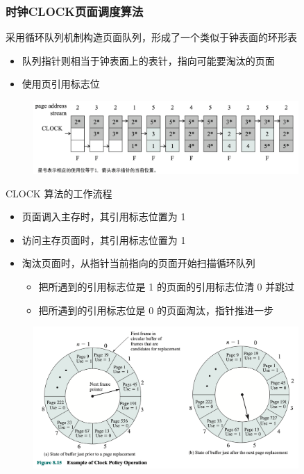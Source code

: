 \documentclass[cs4size,a4paper,10pt]{ctexart}
\begin{document}
		\subsubsection{时钟CLOCK页面调度算法}
		采用循环队列机制构造页面队列，形成了一个类似于钟表面的环形表
		\begin{itemize}
			\item 队列指针则相当于钟表面上的表针，指向可能要淘汰的页面
			\item 使用页引用标志位
		\end{itemize}
		\begin{figure}[H]
			\centering
			\includegraphics[width=0.9\textwidth]{img/clock}
		\end{figure}
		CLOCK 算法的工作流程
		\begin{itemize}
			\item 页面调入主存时，其引用标志位置为 1
			\item 访问主存页面时，其引用标志位置为 1
			\item 淘汰页面时，从指针当前指向的页面开始扫描循环队列
			\begin{itemize}
				\item 把所遇到的引用标志位是 1 的页面的引用标志位清 0 并跳过
				\item 把所遇到的引用标志位是 0 的页面淘汰，指针推进一步
			\end{itemize}
		\end{itemize}
		\begin{figure}[H]
			\centering
			\includegraphics[width=0.9\textwidth]{img/3.3.5.5}
		\end{figure}
\end{document}
